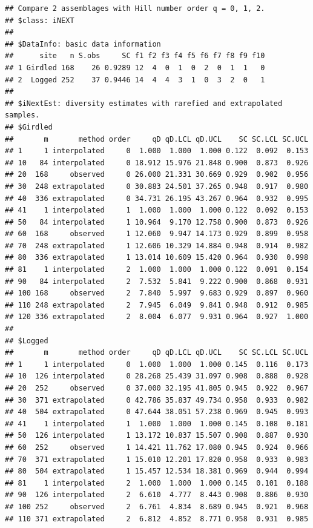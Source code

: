 \documentclass[
]{article}
\begin{document}
\begin{verbatim}
## Compare 2 assemblages with Hill number order q = 0, 1, 2.
## $class: iNEXT
## 
## $DataInfo: basic data information
##      site   n S.obs     SC f1 f2 f3 f4 f5 f6 f7 f8 f9 f10
## 1 Girdled 168    26 0.9289 12  4  0  1  0  2  0  1  1   0
## 2  Logged 252    37 0.9446 14  4  4  3  1  0  3  2  0   1
## 
## $iNextEst: diversity estimates with rarefied and extrapolated samples.
## $Girdled
##       m       method order     qD qD.LCL qD.UCL    SC SC.LCL SC.UCL
## 1     1 interpolated     0  1.000  1.000  1.000 0.122  0.092  0.153
## 10   84 interpolated     0 18.912 15.976 21.848 0.900  0.873  0.926
## 20  168     observed     0 26.000 21.331 30.669 0.929  0.902  0.956
## 30  248 extrapolated     0 30.883 24.501 37.265 0.948  0.917  0.980
## 40  336 extrapolated     0 34.731 26.195 43.267 0.964  0.932  0.995
## 41    1 interpolated     1  1.000  1.000  1.000 0.122  0.092  0.153
## 50   84 interpolated     1 10.964  9.170 12.758 0.900  0.873  0.926
## 60  168     observed     1 12.060  9.947 14.173 0.929  0.899  0.958
## 70  248 extrapolated     1 12.606 10.329 14.884 0.948  0.914  0.982
## 80  336 extrapolated     1 13.014 10.609 15.420 0.964  0.930  0.998
## 81    1 interpolated     2  1.000  1.000  1.000 0.122  0.091  0.154
## 90   84 interpolated     2  7.532  5.841  9.222 0.900  0.868  0.931
## 100 168     observed     2  7.840  5.997  9.683 0.929  0.897  0.960
## 110 248 extrapolated     2  7.945  6.049  9.841 0.948  0.912  0.985
## 120 336 extrapolated     2  8.004  6.077  9.931 0.964  0.927  1.000
## 
## $Logged
##       m       method order     qD qD.LCL qD.UCL    SC SC.LCL SC.UCL
## 1     1 interpolated     0  1.000  1.000  1.000 0.145  0.116  0.173
## 10  126 interpolated     0 28.268 25.439 31.097 0.908  0.888  0.928
## 20  252     observed     0 37.000 32.195 41.805 0.945  0.922  0.967
## 30  371 extrapolated     0 42.786 35.837 49.734 0.958  0.933  0.982
## 40  504 extrapolated     0 47.644 38.051 57.238 0.969  0.945  0.993
## 41    1 interpolated     1  1.000  1.000  1.000 0.145  0.108  0.181
## 50  126 interpolated     1 13.172 10.837 15.507 0.908  0.887  0.930
## 60  252     observed     1 14.421 11.762 17.080 0.945  0.924  0.966
## 70  371 extrapolated     1 15.010 12.201 17.820 0.958  0.933  0.983
## 80  504 extrapolated     1 15.457 12.534 18.381 0.969  0.944  0.994
## 81    1 interpolated     2  1.000  1.000  1.000 0.145  0.101  0.188
## 90  126 interpolated     2  6.610  4.777  8.443 0.908  0.886  0.930
## 100 252     observed     2  6.761  4.834  8.689 0.945  0.921  0.968
## 110 371 extrapolated     2  6.812  4.852  8.771 0.958  0.931  0.985

\end{verbatim}
\end{document}
